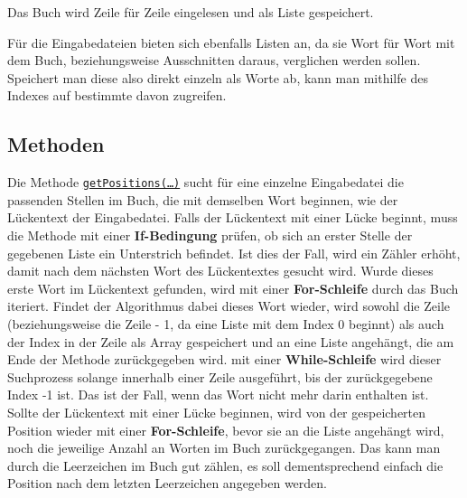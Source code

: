 \documentclass[a4paper, 10pt, ngerman]{scrartcl}
\begin{document}
Das Buch wird Zeile für Zeile eingelesen
und als Liste gespeichert.

Für die Eingabedateien bieten sich ebenfalls Listen an,
da sie Wort für Wort mit dem Buch,
beziehungsweise Ausschnitten daraus,
verglichen werden sollen.
Speichert man diese also direkt einzeln als Worte ab,
kann man mithilfe des Indexes auf bestimmte davon zugreifen.

\subsection{Methoden}
Die Methode \hyperref[sec:getPositions()]{\texttt{getPositions(\ldots)}} sucht für eine einzelne Eingabedatei die passenden Stellen im Buch,
die mit demselben Wort beginnen,
wie der Lückentext der Eingabedatei.
Falls der Lückentext mit einer Lücke beginnt,
muss die Methode mit einer \textbf{If-Bedingung} prüfen,
ob sich an erster Stelle der gegebenen Liste ein Unterstrich befindet.
Ist dies der Fall,
wird ein Zähler erhöht,
damit nach dem nächsten Wort des Lückentextes gesucht wird.
Wurde dieses erste Wort im Lückentext gefunden,
wird mit einer \textbf{For-Schleife} durch das Buch iteriert.
Findet der Algorithmus dabei dieses Wort wieder,
wird sowohl die Zeile
(beziehungsweise die Zeile - 1, da eine Liste mit dem Index 0 beginnt)
als auch der Index in der Zeile als Array gespeichert
und an eine Liste angehängt,
die am Ende der Methode zurückgegeben wird.
mit einer \textbf{While-Schleife} wird dieser Suchprozess solange innerhalb einer Zeile ausgeführt,
bis der zurückgegebene Index -1 ist.
Das ist der Fall,
wenn das Wort nicht mehr darin enthalten ist.
Sollte der Lückentext mit einer Lücke beginnen,
wird von der gespeicherten Position wieder mit einer \textbf{For-Schleife},
bevor sie an die Liste angehängt wird,
noch die jeweilige Anzahl an Worten im Buch zurückgegangen.
Das kann man durch die Leerzeichen im Buch gut zählen,
es soll dementsprechend einfach die Position nach dem letzten Leerzeichen angegeben werden.
\end{document}
